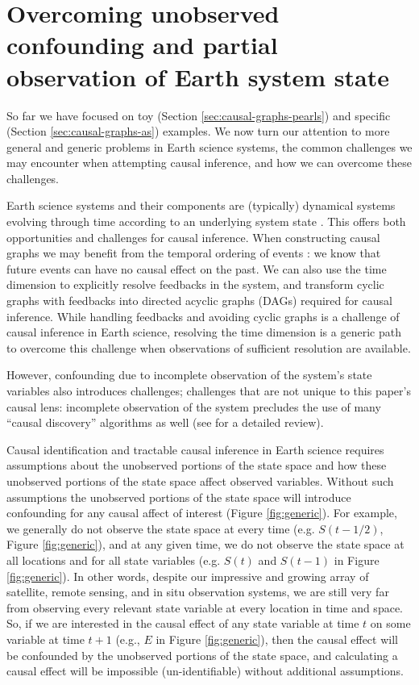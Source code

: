 \documentclass[12pt]{article}
\begin{document}
\section{Overcoming unobserved confounding and partial observation of Earth system state}
\label{sec:necess-cond-caus}

So far we have focused on toy (Section
\ref{sec:causal-graphs-pearls}) and specific (Section
\ref{sec:causal-graphs-as}) examples. We now turn our attention to
more general and generic problems in Earth science systems, the common
challenges we may encounter when attempting causal inference, and how
we can overcome these challenges.

Earth science systems and their components are (typically) dynamical
systems evolving through time according to an underlying system state
\citep{lorenz-1963,lorenz1996predictability,majda-state}. This offers
both opportunities and challenges for causal inference. When
constructing causal graphs we may benefit from the temporal ordering
of events \citep{runge2019inferring}: we know that future events can
have no causal effect on the past. We can also use the time dimension
to explicitly resolve feedbacks in the system, and transform cyclic
graphs with feedbacks into directed acyclic graphs (DAGs) required for
causal inference. While handling feedbacks and avoiding cyclic graphs
is a challenge of causal inference in Earth science, resolving the
time dimension is a generic path to overcome this challenge when
observations of sufficient resolution are available.

However, confounding due to incomplete observation of the system's
state variables also introduces challenges; challenges that are not
unique to this paper's causal lens: incomplete observation of the
system precludes the use of many ``causal discovery'' algorithms as
well (see \citet{runge2019inferring} for a detailed review).

Causal identification and tractable causal inference in Earth science
requires assumptions about the unobserved portions of the state space
and how these unobserved portions of the state space affect observed
variables. Without such assumptions the unobserved portions of the state
space will introduce confounding for any causal affect of interest
(Figure \ref{fig:generic}). For example, we generally do not observe
the state space at every time (e.g. $S(t-1/2)$, Figure
\ref{fig:generic}), and at any given time, we do not observe the
state space at all locations and for all state variables (e.g. $S(t)$
and $S(t-1)$ in Figure \ref{fig:generic}). In other words, despite
our impressive and growing array of satellite, remote sensing, and in
situ observation systems, we are still very far from observing every
relevant state variable at every location in time and space.  So, if
we are interested in the causal effect of any state variable at time
$t$ on some variable at time $t+1$ (e.g., $E$ in Figure
\ref{fig:generic}), then the causal effect will be confounded by the
unobserved portions of the state space, and calculating a causal
effect will be impossible (un-identifiable) without additional
assumptions.
\end{document}
